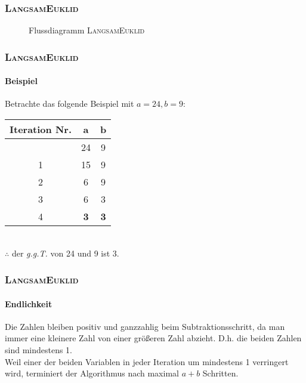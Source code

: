 \documentclass[•]{beamer}
\begin{document}
\begin{frame}
	\frametitle{\textsc{LangsamEuklid}}
	\begin{figure}
	\centering
	\caption{Flussdiagramm \textsc{LangsamEuklid}}
	\end{figure}
\end{frame}
\begin{frame}
	\frametitle{\textsc{LangsamEuklid}}
	\framesubtitle{Beispiel}
	Betrachte das folgende Beispiel mit $a=24, b=9$:\\
	\vspace{5pt}
	\begin{tabular}{|c|c|c|} \hline
	Iteration Nr.& a & b \\ \hline
	 & 24 & 9 \\ \hline
	1 & 15 & 9 \\ \hline
	2 & 6 & 9 \\ \hline
	3 & 6 & 3 \\ \hline
	4 & \textbf{3} & \textbf{3} \\ \hline \hline
	\end{tabular}\\ \vspace{5pt}
	$\therefore$ der \textit{g.g.T.} von 24 und 9 ist 3.
\end{frame}

\begin{frame}
	\frametitle{\textsc{LangsamEuklid}}
	\framesubtitle{Endlichkeit}
	Die Zahlen bleiben positiv und ganzzahlig beim Subtraktionsschritt, da man immer eine kleinere Zahl von einer gr\"o{\ss}eren Zahl abzieht. D.h. die beiden Zahlen sind mindestens 1.
	\\Weil einer der beiden Variablen in jeder Iteration um mindestens 1 verringert wird, terminiert der Algorithmus nach maximal $a+b$ Schritten.
\end{frame}
\end{document}
